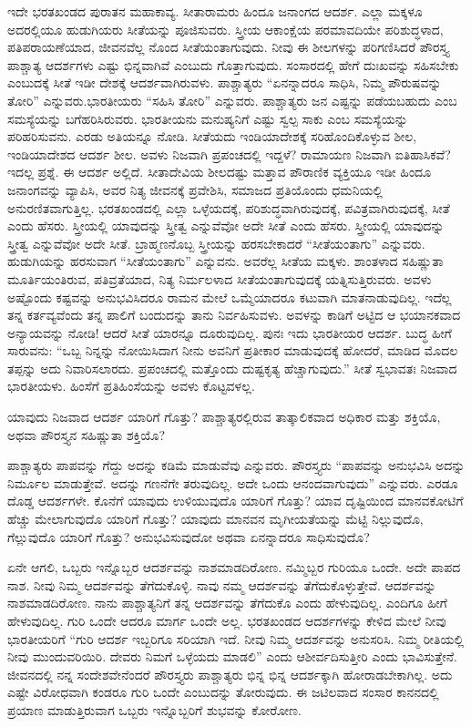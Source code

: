 ಇದೇ ಭರತಖಂಡದ ಪುರಾತನ ಮಹಾಕಾವ್ಯ. ಸೀತಾರಾಮರು ಹಿಂದೂ ಜನಾಂಗದ ಆದರ್ಶ. ಎಲ್ಲಾ ಮಕ್ಕಳೂ ಅದರಲ್ಲಿಯೂ ಹುಡುಗಿಯರು ಸೀತೆಯನ್ನು ಪೂಜಿಸುವರು. ಸ್ತ್ರೀಯ ಆಕಾಂಕ್ಷೆಯ ಪರಮಾವದಿಯೇ ಪರಿಶುದ್ಧಳಾದ, ಪತಿಪರಾಯಣೆಯಾದ, ಜೀವನವೆಲ್ಲ ನೊಂದ ಸೀತೆಯಂತಾಗುವುದು. ನೀವು ಈ ಶೀಲಗಳನ್ನು ಪರಿಗಣಿಸಿದರೆ ಪೌರಸ್ತ್ಯ ಪಾಶ್ಚಾತ್ಯ ಆದರ್ಶಗಳು ಎಷ್ಟು ಭಿನ್ನವಾಗಿವೆ ಎಂಬುದು ಗೊತ್ತಾಗುವುದು. ಸಂಸಾರದಲ್ಲಿ ಹೇಗೆ ದುಃಖವನ್ನು ಸಹಿಸಬೇಕು ಎಂಬುದಕ್ಕೆ ಸೀತೆ ಇಡೀ ದೇಶಕ್ಕೆ ಆದರ್ಶವಾಗಿರುವಳು. ಪಾಶ್ಚಾತ್ಯರು “ಏನನ್ನಾದರೂ ಸಾಧಿಸಿ, ನಿಮ್ಮ ಪೌರುಷವನ್ನು ತೋರಿ” ಎನ್ನುವರು.\break ಭಾರತೀಯರು “ಸಹಿಸಿ ತೋರಿ” ಎನ್ನುವರು. ಪಾಶ್ಚಾತ್ಯರು ಜನ ಎಷ್ಟನ್ನು ಪಡೆಯಬಹುದು ಎಂಬ ಸಮಸ್ಯೆಯನ್ನು ಬಗೆಹರಿಸಿರುವರು. ಭಾರತೀಯನು ಮನುಷ್ಯನಿಗೆ ಎಷ್ಟು ಸ್ವಲ್ಪ ಸಾಕು ಎಂಬ ಸಮಸ್ಯೆಯನ್ನು ಪರಿಹರಿಸುವನು. ಎರಡು ಅತಿಯನ್ನೂ ನೋಡಿ. ಸೀತೆಯದು ಇಂಡಿಯಾದೇಶಕ್ಕೆ ಸರಿಹೊಂದಿಕೊಳ್ಳುವ ಶೀಲ, ಇಂಡಿಯಾದೇಶದ ಆದರ್ಶ ಶೀಲ. ಅವಳು ನಿಜವಾಗಿ ಪ್ರಪಂಚದಲ್ಲಿ ಇದ್ದಳೆ? ರಾಮಾಯಣ ನಿಜವಾಗಿ ಐತಿಹಾಸಿಕವೆ? ಇದಲ್ಲ ಪ್ರಶ್ನೆ. ಈ ಆದರ್ಶ ಅಲ್ಲಿದೆ. ಸೀತಾದೇವಿಯ ಶೀಲದಷ್ಟು ಮತ್ತಾವ ಪೌರಾಣಿಕ ವ್ಯಕ್ತಿಯೂ ಇಡೀ ಹಿಂದೂ ಜನಾಂಗವನ್ನು ವ್ಯಾಪಿಸಿ, ಅವರ ನಿತ್ಯ ಜೀವನಕ್ಕೆ ಪ್ರವೇಶಿಸಿ, ಸಮಾಜದ ಪ್ರತಿಯೊಂದು ಧಮನಿಯಲ್ಲಿ ಅನುರಣಿತವಾಗುತ್ತಿಲ್ಲ. ಭರತಖಂಡದಲ್ಲಿ ಎಲ್ಲಾ ಒಳ್ಳೆಯದಕ್ಕೆ, ಪರಿಶುದ್ಧವಾಗಿರುವುದಕ್ಕೆ, ಪವಿತ್ರವಾಗಿರುವುದಕ್ಕೆ, ಸೀತೆ ಎಂದು ಹೆಸರು. ಸ್ತ್ರೀಯಲ್ಲಿ ಯಾವುದನ್ನು ಸ್ತ್ರೀತ್ವ ಎನ್ನುವೆವೋ ಅದೇ ಸೀತೆ ಎಂದು ಹೆಸರು. ಸ್ತ್ರೀಯಲ್ಲಿ ಯಾವುದನ್ನು ಸ್ತ್ರೀತ್ವ ಎನ್ನುವೆವೋ ಅದೇ ಸೀತೆ. ಬ್ರಾಹ್ಮಣನೊಬ್ಬ ಸ್ತ್ರೀಯನ್ನು ಹರಸಬೇಕಾದರೆ “ಸೀತೆಯಂತಾಗು” ಎನ್ನುವರು. ಹುಡುಗಿಯನ್ನು ಹರಸುವಾಗ “ಸೀತೆಯಂತಾಗು” ಎನ್ನುವನು. ಅವರೆಲ್ಲ ಸೀತೆಯ ಮಕ್ಕಳು. ಶಾಂತಳಾದ ಸಹಿಷ್ಣುತಾ ಮೂರ್ತಿಯಂತಿರುವ, ಪತಿವ್ರತೆಯಾದ, ನಿತ್ಯ ನಿರ್ಮಲಳಾದ ಸೀತೆಯಂತಾಗುವುದಕ್ಕೆ ಯತ್ನಿಸುತ್ತಿರುವರು. ಅವಳು ಅಷ್ಟೊಂದು ಕಷ್ಟವನ್ನು ಅನುಭವಿಸಿದರೂ ರಾಮನ ಮೇಲೆ ಒಮ್ಮೆಯಾದರೂ ಕಟುವಾಗಿ ಮಾತನಾಡುವುದಿಲ್ಲ. ಇದೆಲ್ಲ ತನ್ನ ಕರ್ತವ್ಯವೆಂದು ತನ್ನ ಪಾಲಿಗೆ ಬಂದುದನ್ನು ತಾನು ನಿರ್ವಹಿಸುವಳು. ಅವಳನ್ನು ಕಾಡಿಗೆ ಅಟ್ಟಿದ ಆ ಭಯಾನಕವಾದ ಅನ್ಯಾಯವನ್ನು ನೋಡಿ! ಆದರೆ ಸೀತೆ ಯಾರನ್ನೂ ದೂರುವುದಿಲ್ಲ. ಪುನಃ ಇದು ಭಾರತೀಯರ ಆದರ್ಶ. ಬುದ್ಧ ಹೀಗೆ ಸಾರುವನು: “ಒಬ್ಬ ನಿನ್ನನ್ನು ನೋಯಿಸಿದಾಗ ನೀನು ಅವನಿಗೆ ಪ್ರತೀಕಾರ ಮಾಡುವುದಕ್ಕೆ ಹೋದರೆ, ಮಾಡಿದ ಮೊದಲ ತಪ್ಪನ್ನು ಅದು ನಿವಾರಿಸಲಾರದು. ಪ್ರಪಂಚದಲ್ಲಿ ಮತ್ತೊಂದು ದುಷ್ಟಕೃತ್ಯ ಹೆಚ್ಚಾಗುವುದು.” ಸೀತೆ ಸ್ವಭಾವತಃ ನಿಜವಾದ ಭಾರತೀಯಳು. ಹಿಂಸೆಗೆ ಪ್ರತಿಹಿಂಸೆಯನ್ನು ಅವಳು ಕೊಟ್ಟವಳಲ್ಲ.

ಯಾವುದು ನಿಜವಾದ ಆದರ್ಶ ಯಾರಿಗೆ ಗೊತ್ತು? ಪಾಶ್ಚಾತ್ಯರಲ್ಲಿರುವ ತಾತ್ಕಾಲಿಕವಾದ ಅಧಿಕಾರ ಮತ್ತು ಶಕ್ತಿಯೊ, ಅಥವಾ ಪೌರಸ್ತ್ಯನ ಸಹಿಷ್ಣುತಾ ಶಕ್ತಿಯೊ?

ಪಾಶ್ಚಾತ್ಯರು ಪಾಪವನ್ನು ಗೆದ್ದು ಅದನ್ನು ಕಡಿಮೆ ಮಾಡುವೆವು ಎನ್ನುವರು. ಪೌರಸ್ತ್ಯರು “ಪಾಪವನ್ನು ಅನುಭವಿಸಿ ಅದನ್ನು ನಿರ್ಮೂಲ ಮಾಡುತ್ತೇವೆ. ಅದನ್ನು ಗಣನೆಗೇ ತರುವುದಿಲ್ಲ. ಅದೇ ಒಂದು ಆನಂದವಾಗುವುದು” ಎನ್ನುವರು. ಎರಡೂ ದೊಡ್ಡ ಆದರ್ಶಗಳೇ. ಕೊನೆಗೆ ಯಾವುದು ಉಳಿಯುವುದೊ ಯಾರಿಗೆ ಗೊತ್ತು? ಯಾವ ದೃಷ್ಟಿಯಿಂದ ಮಾನವಕೋಟಿಗೆ ಹೆಚ್ಚು ಮೇಲಾಗುವುದೊ ಯಾರಿಗೆ ಗೊತ್ತು? ಯಾವುದು ಮಾನವನ ಮೃಗೀಯತೆಯನ್ನು ಮೆಟ್ಟಿ ನಿಲ್ಲುವುದೊ, ಗೆಲ್ಲುವುದೊ ಯಾರಿಗೆ ಗೊತ್ತು? ಅನುಭವಿಸುವುದೋ ಅಥವಾ ಏನನ್ನಾದರೂ ಸಾಧಿಸುವುದೊ?

ಏನೇ ಆಗಲಿ, ಒಬ್ಬರು ಇನ್ನೊಬ್ಬರ ಆದರ್ಶವನ್ನು ನಾಶಮಾಡದಿರೋಣ. ನಮ್ಮಿಬ್ಬರ ಗುರಿಯೂ ಒಂದೇ. ಅದೇ ಪಾಪದ ನಾಶ. ನೀವು ನಿಮ್ಮ ಆದರ್ಶವನ್ನು ತೆಗೆದುಕೊಳ್ಳಿ. ನಾವು ನಮ್ಮ ಆದರ್ಶವನ್ನು ತೆಗೆದುಕೊಳ್ಳುತ್ತೇವೆ. ಆದರ್ಶವನ್ನು ನಾಶಮಾಡದಿರೋಣ. ನಾನು ಪಾಶ್ಚಾತ್ಯನಿಗೆ ತನ್ನ ಆದರ್ಶವನ್ನು ತೆಗೆದುಕೊ ಎಂದು ಹೇಳುವುದಿಲ್ಲ. ಎಂದಿಗೂ ಹೀಗೆ ಹೇಳುವುದಿಲ್ಲ. ಗುರಿ ಒಂದೇ ಆದರೂ ಮಾರ್ಗ ಒಂದೇ ಅಲ್ಲ. ಭರತಖಂಡದ ಆದರ್ಶಗಳನ್ನು ಕೇಳಿದ ಮೇಲೆ ನೀವು ಭಾರತೀಯರಿಗೆ “ಗುರಿ ಆದರ್ಶ ಇಬ್ಬರಿಗೂ ಸರಿಯಾಗಿ ಇದೆ. ನೀವು ನಿಮ್ಮ ಆದರ್ಶವನ್ನು ಅನುಸರಿಸಿ. ನಿಮ್ಮ ರೀತಿಯಲ್ಲಿ ನೀವು ಮುಂದುವರಿಯಿರಿ. ದೇವರು ನಿಮಗೆ ಒಳ್ಳೆಯದು ಮಾಡಲಿ” ಎಂದು ಆಶೀರ್ವದಿಸುತ್ತೀರಿ ಎಂದು ಭಾವಿಸುತ್ತೇನೆ. ಜೀವನದಲ್ಲಿ ನನ್ನ ಸಂದೇಶವೇನೆಂದರೆ ಪೌರಸ್ತ್ಯರು ಪಾಶ್ಚಾತ್ಯರು ಭಿನ್ನ ಭಿನ್ನ ಆದರ್ಶಕ್ಕಾಗಿ ಹೋರಾಡಬೇಕಾಗಿಲ್ಲ. ಅದು ಎಷ್ಟೇ ವಿರೋಧವಾಗಿ ಕಂಡರೂ ಗುರಿ ಒಂದೇ ಎಂಬುದನ್ನು ತೋರುವುದು. ಈ ಜಟಿಲವಾದ ಸಂಸಾರ ಕಾನನದಲ್ಲಿ ಪ್ರಯಾಣ ಮಾಡುತ್ತಿರುವಾಗ ಒಬ್ಬರು ಇನ್ನೊಬ್ಬರಿಗೆ ಶುಭವನ್ನು ಕೋರೋಣ.

